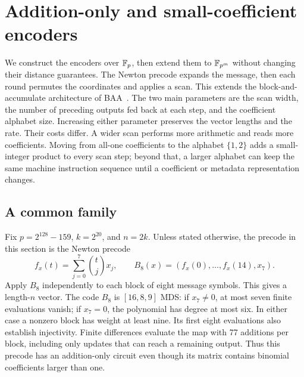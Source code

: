 \section{Addition-only and small-coefficient encoders}\label{sec:width-coefficient}

We construct the encoders over $\mathbb F_p$, then extend them to $\mathbb F_{p^m}$
without changing their distance guarantees. The Newton precode expands
the message, then each round permutes the coordinates and applies a scan.
This extends the block-and-accumulate architecture of BAA~\cite{baa26}.
The two main parameters are the scan width, the number of preceding
outputs fed back at each step, and the coefficient alphabet size.
Increasing either parameter preserves the vector lengths and the rate.
Their costs differ. A wider scan performs more arithmetic and reads more
coefficients. Moving from all-one coefficients to the alphabet $\{1,2\}$
adds a small-integer product to every scan step; beyond that, a larger
alphabet can keep the same machine instruction sequence until a
coefficient or metadata representation changes.

\subsection{A common family}

Fix $p=2^{128}-159$, $k=2^{20}$, and $n=2k$. Unless stated otherwise,
the precode in this section is the Newton precode
\begin{equation}\label{eq:extended-newton-eight}
 f_x(t)=\sum_{j=0}^{7}\binom tj x_j,\qquad
 B_8(x)=(f_x(0),\ldots,f_x(14),x_7).
\end{equation}
Apply $B_8$ independently to each block of eight message symbols. This
gives a length-$n$ vector. The code $B_8$ is $[16,8,9]$ MDS: if $x_7\ne0$,
at most seven finite evaluations vanish; if $x_7=0$, the polynomial
has degree at most six. In either case a nonzero block has weight at
least nine. Its first eight evaluations also establish injectivity.
Finite differences evaluate the map with 77 additions per block,
including only updates that can reach a remaining output. Thus this
precode has an addition-only circuit even though its matrix contains
binomial coefficients larger than one.

